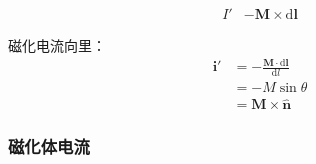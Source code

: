 \documentclass[12pt,onecolumn,a4paper]{book}
\numberwithin{table}{subsection}
\numberwithin{equation}{subsection}
\begin{document}
    \begin{align}
        I' & - \mathbf{M} \times \mathrm{d} \mathbf{l}
    \end{align}

    磁化电流向里：
    \begin{align}
        \mathbf{i'} & = - \frac{ \mathbf{M} \cdot \mathrm{d} \mathbf{l}}{\mathrm{d} l} \\
                    & = - M \sin \theta                                                \\
                    & = \mathbf{M} \times \hat{\mathbf{n}}
    \end{align}

    \subsubsection{磁化体电流}
\end{document}
